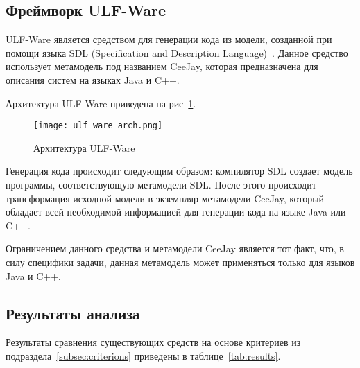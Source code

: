 \subsection{Фреймворк ULF-Ware}



ULF-Ware является средством для генерации кода из модели, созданной при помощи
языка SDL (Specification and Description Language)~\cite{metamodeling}. Данное
средство использует метамодель под названием CeeJay, которая предназначена для
описания систем на языках Java и C++.

Архитектура ULF-Ware приведена на рис~\ref{fig:ulf_ware_arch}.

\begin{figure}[htbc!]
    \begin{center}
        \texttt{[image: ulf\_ware\_arch.png]}
    \end{center}
    \caption{Архитектура ULF-Ware}
    \label{fig:ulf_ware_arch}
\end{figure}

Генерация кода происходит следующим образом: компилятор SDL создает модель
программы, соответствующую метамодели SDL. После этого происходит трансформация
исходной модели в экземпляр метамодели CeeJay, который обладает всей необходимой
информацией для генерации кода на языке Java или C++.

Ограничением данного средства и метамодели CeeJay является тот факт, что, в силу
специфики задачи, данная метамодель может применяться только для языков Java и
C++.

\subsection{Результаты анализа}

Результаты сравнения существующих средств на основе критериев из
подраздела~\ref{subsec:criterions} приведены в таблице~\ref{tab:results}.

